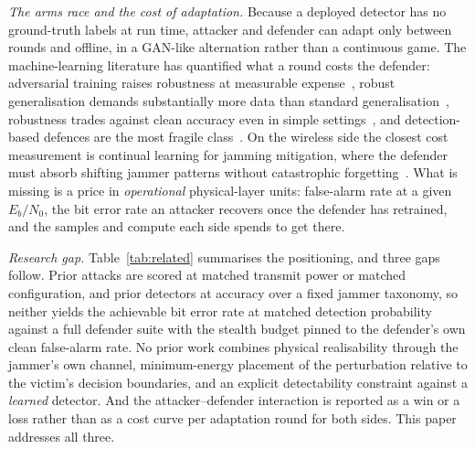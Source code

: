 \textit{The arms race and the cost of adaptation.}
Because a deployed detector has no ground-truth labels at run time, attacker and defender can adapt only between rounds and offline, in a GAN-like alternation rather than a continuous game.
The machine-learning literature has quantified what a round costs the defender: adversarial training raises robustness at measurable expense~\cite{madry2018towards}, robust generalisation demands substantially more data than standard generalisation~\cite{schmidt2018adversarially}, robustness trades against clean accuracy even in simple settings~\cite{tsipras2019robustness}, and detection-based defences are the most fragile class~\cite{carlini2017detected,tramer2020adaptive}.
On the wireless side the closest cost measurement is continual learning for jamming mitigation, where the defender must absorb shifting jammer patterns without catastrophic forgetting~\cite{davaslioglu2024continual}.
What is missing is a price in \emph{operational} physical-layer units: false-alarm rate at a given $E_b/N_0$, the bit error rate an attacker recovers once the defender has retrained, and the samples and compute each side spends to get there.

\textit{Research gap.}
Table~\ref{tab:related} summarises the positioning, and three gaps follow.
Prior attacks are scored at matched transmit power or matched configuration, and prior detectors at accuracy over a fixed jammer taxonomy, so neither yields the achievable bit error rate at matched detection probability against a full defender suite with the stealth budget pinned to the defender's own clean false-alarm rate.
No prior work combines physical realisability through the jammer's own channel, minimum-energy placement of the perturbation relative to the victim's decision boundaries, and an explicit detectability constraint against a \emph{learned} detector.
And the attacker--defender interaction is reported as a win or a loss rather than as a cost curve per adaptation round for both sides.
This paper addresses all three.


